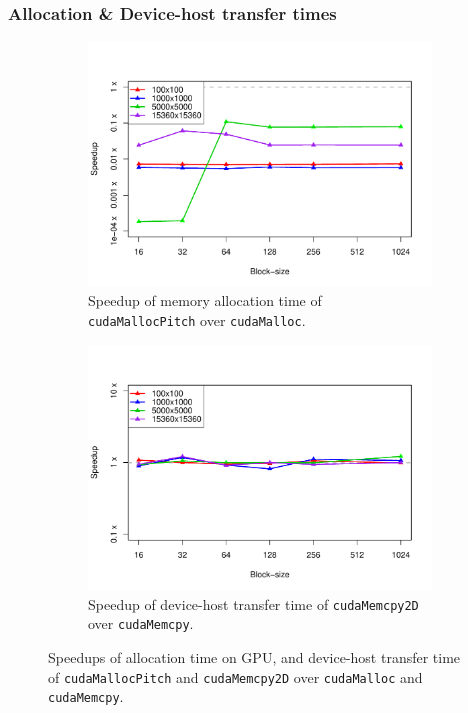 \documentclass[12pt]{article}
\begin{document}
\subsubsection*{Allocation \& Device-host transfer times}
\begin{figure}
	\centering
	\begin{subfigure}{0.48\linewidth}
		\centering
		\includegraphics[width=0.85\linewidth]{../plots/alloc_sharedglob.pdf}
		\caption{Speedup of memory allocation time of \texttt{cudaMallocPitch} over \texttt{cudaMalloc}.}
		\label{fig:7}
	\end{subfigure}\hfill
	\begin{subfigure}{0.48\linewidth}
		\centering
		\includegraphics[width=0.85\linewidth]{../plots/RAMsharedglob.pdf}
		\caption{Speedup of device-host transfer time of \texttt{cudaMemcpy2D} over \texttt{cudaMemcpy}.}
		\label{fig:8}
	\end{subfigure}
	\caption{Speedups of allocation time on GPU, and device-host transfer time of \texttt{cudaMallocPitch} and \texttt{cudaMemcpy2D} over \texttt{cudaMalloc} and \texttt{cudaMemcpy}.}
\end{figure}
\end{document}
